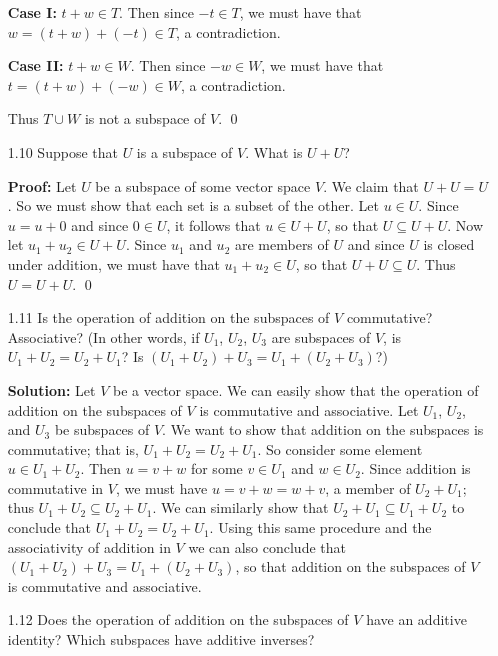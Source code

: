 \begin{enumerate}
      \textbf{Case I:} $t + w \in T$. Then since $-t \in T$, we must have that
      $w = (t + w) + (-t) \in T$, a contradiction.

      \textbf{Case II:} $t + w \in W$. Then since $-w \in W$, we must have that
      $t = (t + w) + (-w) \in W$, a contradiction.

      Thus $T \cup W$ is not a subspace of $V$. \qed
   \item[1.10] Suppose that $U$ is a subspace of $V$. What is $U + U$?

      \textbf{Proof:} Let $U$ be a subspace of some vector space $V$. We claim
      that $U + U = U$. So we must show that each set is a subset of the other.
      Let $u \in U$. Since $u = u + 0$ and since $0 \in U$, it follows that
      $u \in U + U$, so that $U \subseteq U + U$. Now let $u_1 + u_2 \in U + U$.
      Since $u_1$ and $u_2$ are members of $U$ and since $U$ is closed under
      addition, we must have that $u_1 + u_2 \in U$, so that
      $U + U \subseteq U$. Thus $U = U + U$. \qed
   \item[1.11] Is the operation of addition on the subspaces of $V$ commutative?
               Associative? (In other words, if $U_1$, $U_2$, $U_3$ are 
               subspaces of $V$, is $U_1 + U_2 = U_2 + U_1$? Is
               $(U_1 + U_2) + U_3 = U_1 + (U_2 + U_3)$?)

      \textbf{Solution:} Let $V$ be a vector space. We can easily show that the
      operation of addition on the subspaces of $V$ is commutative and 
      associative. Let $U_1$, $U_2$, and $U_3$ be subspaces of $V$. We want to
      show that addition on the subspaces is commutative; that is,
      $U_1 + U_2 = U_2 + U_1$. So consider some element $u \in U_1 + U_2$. Then
      $u = v + w$ for some $v \in U_1$ and $w \in U_2$. Since addition is
      commutative in $V$, we must have $u = v + w = w + v$, a member of
      $U_2 + U_1$; thus $U_1 + U_2 \subseteq U_2 + U_1$. We can similarly show
      that $U_2 + U_1 \subseteq U_1 + U_2$ to conclude that
      $U_1 + U_2 = U_2 + U_1$. Using this same procedure and the associativity
      of addition in $V$ we can also conclude that
      $(U_1 + U_2) + U_3 = U_1 + (U_2 + U_3)$, so that addition on the subspaces
      of $V$ is commutative and associative.
   \item[1.12] Does the operation of addition on the subspaces of $V$ have an
               additive identity? Which subspaces have additive inverses?


\end{enumerate}
